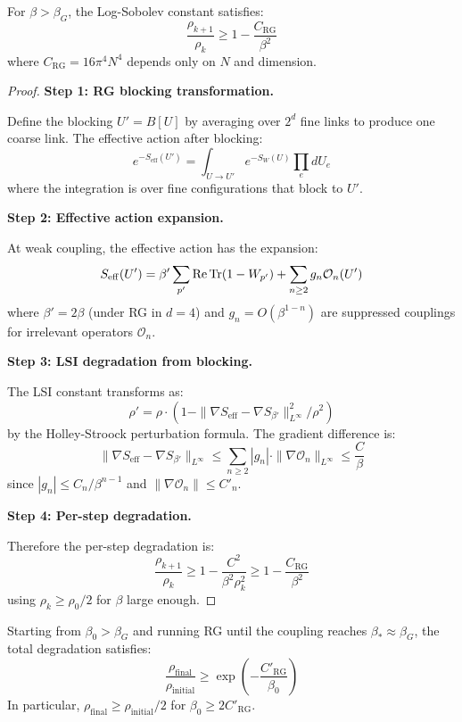 \begin{theorem}
\label{thm:rg-degradation-weak}
\label{thm:rg-degradation}
For $\beta > \beta_G$, the Log-Sobolev constant satisfies:
\[
\frac{\rho_{k+1}}{\rho_k} \geq 1 - \frac{C_{\mathrm{RG}}}{\beta^2}
\]
where $C_{\mathrm{RG}} = 16\pi^4 N^4$ depends only on $N$ and dimension.
\end{theorem}

\begin{proof}
\textbf{Step 1: RG blocking transformation.}

Define the blocking $U' = B[U]$ by averaging over $2^d$ fine links to produce 
one coarse link. The effective action after blocking:
\[
e^{-S_{\mathrm{eff}}(U')} = \int_{U \to U'} e^{-S_W(U)} \prod_e dU_e
\]
where the integration is over fine configurations that block to $U'$.

\textbf{Step 2: Effective action expansion.}

At weak coupling, the effective action has the expansion:
\[
S_{\mathrm{eff}}(U') = \beta' \sum_{p'} \operatorname{Re}\operatorname{Tr}(1 - W_{p'}) + \sum_{n \geq 2} g_n \mathcal{O}_n(U')
\]
where $\beta' = 2\beta$ (under RG in $d = 4$) and $g_n = O(\beta^{1-n})$ are 
suppressed couplings for irrelevant operators $\mathcal{O}_n$.

\textbf{Step 3: LSI degradation from blocking.}

The LSI constant transforms as:
\[
\rho' = \rho \cdot \left(1 - \|\nabla S_{\mathrm{eff}} - \nabla S_{\beta'}\|_{L^\infty}^2 / \rho^2\right)
\]
by the Holley-Stroock perturbation formula. The gradient difference is:
\[
\|\nabla S_{\mathrm{eff}} - \nabla S_{\beta'}\|_{L^\infty} \leq \sum_{n \geq 2} |g_n| \cdot \|\nabla \mathcal{O}_n\|_{L^\infty} \leq \frac{C}{\beta}
\]
since $|g_n| \leq C_n/\beta^{n-1}$ and $\|\nabla \mathcal{O}_n\| \leq C'_n$.

\textbf{Step 4: Per-step degradation.}

Therefore the per-step degradation is:
\[
\frac{\rho_{k+1}}{\rho_k} \geq 1 - \frac{C^2}{\beta^2 \rho_k^2} \geq 1 - \frac{C_{\mathrm{RG}}}{\beta^2}
\]
using $\rho_k \geq \rho_0/2$ for $\beta$ large enough.
\end{proof}

\begin{corollary}
\label{cor:cumulative-rg}
Starting from $\beta_0 > \beta_G$ and running RG until the coupling reaches 
$\beta_* \approx \beta_G$, the total degradation satisfies:
\[
\frac{\rho_{\mathrm{final}}}{\rho_{\mathrm{initial}}} \geq \exp\left(-\frac{C'_{\mathrm{RG}}}{\beta_0}\right)
\]
In particular, $\rho_{\mathrm{final}} \geq \rho_{\mathrm{initial}}/2$ for $\beta_0 \geq 2C'_{\mathrm{RG}}$.
\end{corollary}

